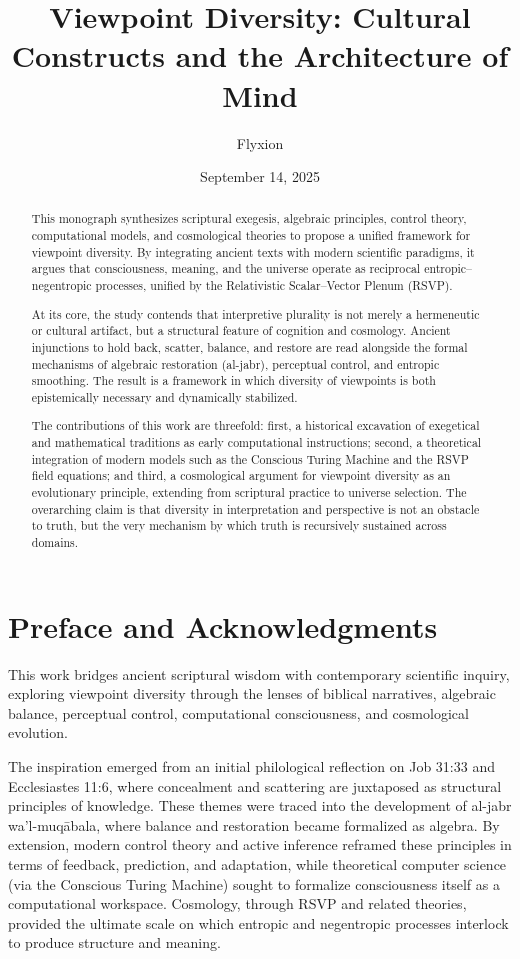 \documentclass[a4paper,11pt,openany]{book}
\title{Viewpoint Diversity: Cultural Constructs and the Architecture of Mind}
\author{Flyxion}
\date{September 14, 2025}
\begin{document}
\maketitle

\begin{abstract}
This monograph synthesizes scriptural exegesis, algebraic principles, control theory, computational models, and cosmological theories to propose a unified framework for viewpoint diversity. By integrating ancient texts with modern scientific paradigms, it argues that consciousness, meaning, and the universe operate as reciprocal entropic–negentropic processes, unified by the Relativistic Scalar–Vector Plenum (RSVP). 

At its core, the study contends that interpretive plurality is not merely a hermeneutic or cultural artifact, but a structural feature of cognition and cosmology. Ancient injunctions to hold back, scatter, balance, and restore are read alongside the formal mechanisms of algebraic restoration (al-jabr), perceptual control, and entropic smoothing. The result is a framework in which diversity of viewpoints is both epistemically necessary and dynamically stabilized.

The contributions of this work are threefold: first, a historical excavation of exegetical and mathematical traditions as early computational instructions; second, a theoretical integration of modern models such as the Conscious Turing Machine and the RSVP field equations; and third, a cosmological argument for viewpoint diversity as an evolutionary principle, extending from scriptural practice to universe selection. The overarching claim is that diversity in interpretation and perspective is not an obstacle to truth, but the very mechanism by which truth is recursively sustained across domains.
\end{abstract}

\chapter*{Preface and Acknowledgments}
This work bridges ancient scriptural wisdom with contemporary scientific inquiry, exploring viewpoint diversity through the lenses of biblical narratives, algebraic balance, perceptual control, computational consciousness, and cosmological evolution. 

The inspiration emerged from an initial philological reflection on Job 31:33 and Ecclesiastes 11:6, where concealment and scattering are juxtaposed as structural principles of knowledge. These themes were traced into the development of al-jabr wa'l-muqābala, where balance and restoration became formalized as algebra. By extension, modern control theory and active inference reframed these principles in terms of feedback, prediction, and adaptation, while theoretical computer science (via the Conscious Turing Machine) sought to formalize consciousness itself as a computational workspace. Cosmology, through RSVP and related theories, provided the ultimate scale on which entropic and negentropic processes interlock to produce structure and meaning.
\end{document}
